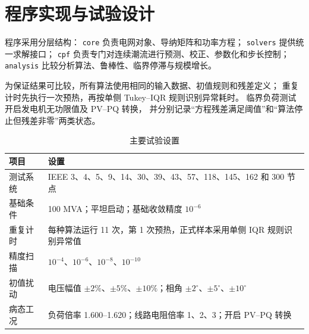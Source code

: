 \section{程序实现与试验设计}
\label{sec:experiments}

程序采用分层结构：
\texttt{core} 负责电网对象、导纳矩阵和功率方程；
\texttt{solvers} 提供统一求解接口；
\texttt{cpf} 负责专门对连续潮流进行预测、校正、参数化和步长控制；
\texttt{analysis} 比较分析算法、鲁棒性、临界停滞与规模增长。

为保证结果可比较，所有算法使用相同的输入数据、初值规则和残差定义；
重复计时先执行一次预热，再按单侧 Tukey--IQR 规则识别异常耗时。
临界负荷测试开启发电机无功限值及 PV--PQ 转换，
并分别记录“方程残差满足阈值”和“算法停止但残差非零”两类状态。

\begin{table}[H]
\centering
\caption{主要试验设置}
\label{tab:settings}
\begin{tabularx}{\textwidth}{p{3.8cm}X}
\toprule
项目 & 设置\\
\midrule
测试系统 & IEEE 3、4、5、9、14、30、39、43、57、118、145、162 和 300 节点\\
基础条件 & 100 MVA；平坦启动；基础收敛精度 $10^{-6}$\\
重复计时 & 每种算法运行 11 次，第 1 次预热，正式样本采用单侧 IQR 规则识别异常值\\
精度扫描 & $10^{-4}$、$10^{-6}$、$10^{-8}$、$10^{-10}$\\
初值扰动 & 电压幅值 $\pm2\%$、$\pm5\%$、$\pm10\%$；相角 $\pm2^\circ$、$\pm5^\circ$、$\pm10^\circ$\\
病态工况 & 负荷倍率 1.600--1.620；线路电阻倍率 1、2、3；开启 PV--PQ 转换\\
\bottomrule
\end{tabularx}
\end{table}
